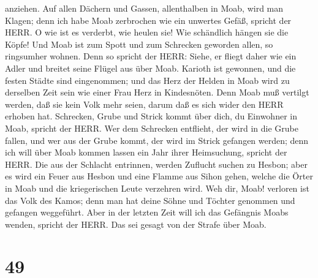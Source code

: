 anziehen.  Auf allen Dächern und Gassen, allenthalben in
Moab, wird man Klagen; denn ich habe Moab zerbrochen wie ein unwertes
Gefäß, spricht der HERR.  O wie ist es verderbt, wie heulen
sie! Wie schändlich hängen sie die Köpfe! Und Moab ist zum Spott und zum
Schrecken geworden allen, so ringsumher wohnen.  Denn so
spricht der HERR: Siehe, er fliegt daher wie ein Adler und breitet seine
Flügel aus über Moab.  Karioth ist gewonnen, und die festen
Städte sind eingenommen; und das Herz der Helden in Moab wird zu
derselben Zeit sein wie einer Frau Herz in Kindesnöten. 
Denn Moab muß vertilgt werden, daß sie kein Volk mehr seien, darum daß
es sich wider den HERR erhoben hat.  Schrecken, Grube und
Strick kommt über dich, du Einwohner in Moab, spricht der HERR.
 Wer dem Schrecken entflieht, der wird in die Grube fallen,
und wer aus der Grube kommt, der wird im Strick gefangen werden; denn
ich will über Moab kommen lassen ein Jahr ihrer Heimsuchung, spricht der
HERR.  Die aus der Schlacht entrinnen, werden Zuflucht
suchen zu Hesbon; aber es wird ein Feuer aus Hesbon und eine Flamme aus
Sihon gehen, welche die Örter in Moab und die kriegerischen Leute
verzehren wird.  Weh dir, Moab! verloren ist das Volk des
Kamos; denn man hat deine Söhne und Töchter genommen und gefangen
weggeführt.  Aber in der letzten Zeit will ich das
Gefängnis Moabs wenden, spricht der HERR. Das sei gesagt von der Strafe
über Moab.

\hypertarget{section-48}{%
\section{49}\label{section-48}}

